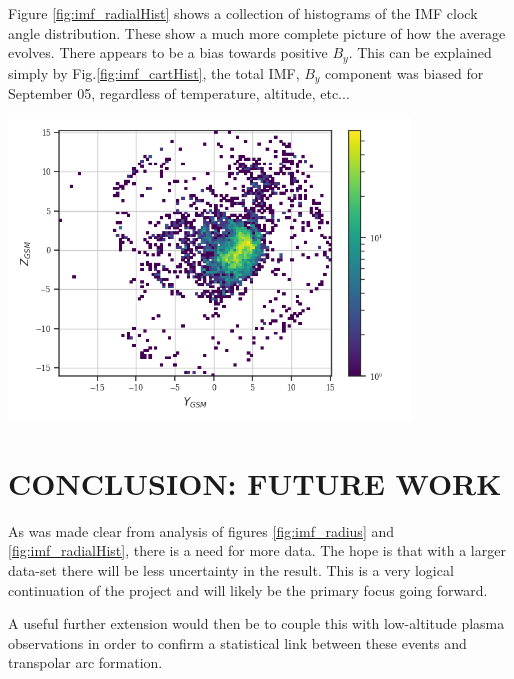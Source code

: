 \documentclass{article}
\newenvironment{Figure}
  {\par\medskip\noindent\minipage{\linewidth}}
  {\endminipage\par\medskip}
\begin{document}
\begin{multicols}{2}
Figure \ref{fig:imf_radialHist} shows a collection of histograms of the IMF clock angle distribution. These show a much more complete picture of how the average evolves. There appears to be a bias towards positive $B_y$. This can be explained simply by Fig.\ref{fig:imf_cartHist}, the total IMF, $B_y$ component was biased for September 05, regardless of temperature, altitude, etc...

\begin{Figure}
    \centering
    \includegraphics[width=0.8\textwidth]{imf_cartHist.png}
    \label{fig:imf_cartHist}
\end{Figure}

\section{CONCLUSION: FUTURE WORK}
As was made clear from analysis of figures \ref{fig:imf_radius} and \ref{fig:imf_radialHist}, there is a need for more data. The hope is that with a larger data-set there will be less uncertainty in the result. This is a very logical continuation of the project and will likely be the primary focus going forward.

A useful further extension would then be to couple this with low-altitude plasma observations in order to confirm a statistical link between these events and transpolar arc formation.

\end{multicols}
\end{document}
